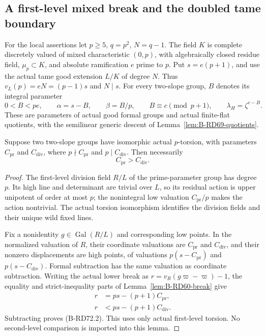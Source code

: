 \subsection{A first-level mixed break and the doubled tame boundary}

For the local assertions let \(p\ge5\), \(q=p^2\), \(N=q-1\).
The field \(K\) is complete discretely valued of mixed characteristic
\((0,p)\), with algebraically closed residue field, \(\mu_p\subset K\),
and absolute ramification \(e\) prime to \(p\). Put \(s=e(p+1)\),
and use the actual tame good extension \(L/K\) of degree \(N\).
Thus \(v_L(p)=eN=(p-1)s\) and \(N\mid s\).
For every two-slope group, \(B\) denotes its integral parameter
\[
 0<B<pe,\qquad \alpha=s-B,\qquad \beta=B/p,\qquad
 B\equiv c\pmod{p+1},\qquad \lambda_H=\zeta^{c-B}.
 \tag{B-RD72.1}
\]
These are parameters of actual good formal groups and actual
finite-flat quotients, with the semilinear generic descent of
Lemma~\ref{lem:B-RD69-quotients}.

\begin{lemma}
\label{lem:B-RD72-first-mixed}
Suppose two two-slope groups have isomorphic actual \(p\)-torsion,
with parameters \(C_{\mathrm{pr}}\) and \(C_{\mathrm{div}}\), where
\(p\nmid C_{\mathrm{pr}}\) and \(p\mid C_{\mathrm{div}}\).
Then necessarily
\[
                 C_{\mathrm{pr}}>C_{\mathrm{div}}.
 \tag{B-RD72.2}
\]
\end{lemma}
\begin{proof}
The first-level division field \(R/L\) of the prime-parameter group
has degree \(p\). Its high line and determinant are trivial over
\(L\), so its residual action is upper unipotent of order at most
\(p\); the nonintegral low valuation \(C_{\mathrm{pr}}/p\) makes
the action nontrivial. The actual torsion isomorphism identifies
the division fields and their unique wild fixed lines.

Fix a nonidentity \(g\in\operatorname{Gal}(R/L)\) and corresponding
low points. In the normalized valuation of \(R\), their coordinate
valuations are \(C_{\mathrm{pr}}\) and \(C_{\mathrm{div}}\), and
their nonzero displacements are high points, of valuations
\(p(s-C_{\mathrm{pr}})\) and \(p(s-C_{\mathrm{div}})\).
Formal subtraction has the same valuation as coordinate subtraction.
Writing the actual lower break as
\(r=v_R(g\varpi-\varpi)-1\), the equality and strict-inequality
parts of Lemma~\ref{lem:B-RD60-break} give
\[
 \begin{aligned}
 r&=ps-(p+1)C_{\mathrm{pr}},\\
 r&<ps-(p+1)C_{\mathrm{div}}.
 \end{aligned}
 \tag{B-RD72.3}
\]
Subtracting proves (B-RD72.2). This uses only actual first-level
torsion. No second-level comparison is imported into this lemma.
\end{proof}

